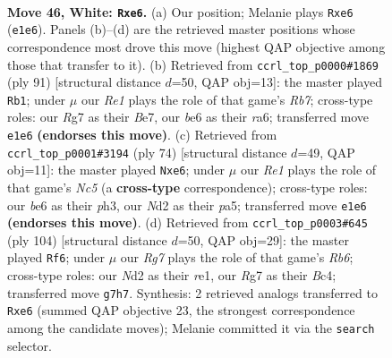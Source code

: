\documentclass[11pt]{article}
\begin{document}
\clearpage

\begin{figure}[p]\centering
\begin{subfigure}{0.46\textwidth}\centering
\resizebox{\linewidth}{!}{%
\newchessgame
\chessboard[
  setfen={5k2/6R1/2n1b2B/8/1p1p2P1/pP6/P1PN3K/4R3 w - - 1 46},
  showmover=false,
  pgfstyle=straightmove, color=movearrow, markmove={e1-e6}
]}
\caption{}
\end{subfigure}\hfill
\begin{subfigure}{0.46\textwidth}\centering
\resizebox{\linewidth}{!}{%
\newchessgame
\chessboard[
  setfen={8/4bk2/R4p2/2p3p1/4P2p/3K3P/1r1B1PP1/8 b - - 3 46},
  showmover=false,
  pgfstyle=straightmove, color=movearrow, markmove={b2-b1}
]}
\caption{}
\end{subfigure}
\\[4pt]
\begin{subfigure}{0.46\textwidth}\centering
\resizebox{\linewidth}{!}{%
\newchessgame
\chessboard[
  setfen={r7/4k3/1bp1b3/p1N1p2B/4P1P1/1P5p/P7/3R3K w - - 1 38},
  showmover=false,
  pgfstyle=straightmove, color=movearrow, markmove={c5-e6}
]}
\caption{}
\end{subfigure}\hfill
\begin{subfigure}{0.46\textwidth}\centering
\resizebox{\linewidth}{!}{%
\newchessgame
\chessboard[
  setfen={8/3b4/1R6/2kPp1p1/2B4p/3K1P1P/6P1/4r3 w - - 3 53},
  showmover=false,
  pgfstyle=straightmove, color=movearrow, markmove={b6-f6}
]}
\caption{}
\end{subfigure}
\caption{\textbf{Move 46, White: \texttt{Rxe6}.} (a) Our position; Melanie plays \texttt{Rxe6} (\texttt{e1e6}). Panels (b)--(d) are the retrieved master positions whose correspondence most drove this move (highest QAP objective among those that transfer to it). (b) Retrieved from \texttt{ccrl\_top\_p0000\#1869} (ply 91) [structural distance $d$=50, QAP obj=13]: the master played \texttt{Rb1}; under $\mu$ our \emph{Re1} plays the role of that game's \emph{Rb7}; cross-type roles: our \emph{R}g7 as their \emph{B}e7, our \emph{b}e6 as their \emph{r}a6; transferred move \texttt{e1e6} \textbf{(endorses this move)}. (c) Retrieved from \texttt{ccrl\_top\_p0001\#3194} (ply 74) [structural distance $d$=49, QAP obj=11]: the master played \texttt{Nxe6}; under $\mu$ our \emph{Re1} plays the role of that game's \emph{Nc5} (a \textbf{cross-type} correspondence); cross-type roles: our \emph{b}e6 as their \emph{p}h3, our \emph{N}d2 as their \emph{p}a5; transferred move \texttt{e1e6} \textbf{(endorses this move)}. (d) Retrieved from \texttt{ccrl\_top\_p0003\#645} (ply 104) [structural distance $d$=50, QAP obj=29]: the master played \texttt{Rf6}; under $\mu$ our \emph{Rg7} plays the role of that game's \emph{Rb6}; cross-type roles: our \emph{N}d2 as their \emph{r}e1, our \emph{R}g7 as their \emph{B}c4; transferred move \texttt{g7h7}. Synthesis: 2 retrieved analogs transferred to \texttt{Rxe6} (summed QAP objective 23, the strongest correspondence among the candidate moves); Melanie committed it via the \texttt{search} selector.}
\label{fig:thought-m90}
\end{figure}
\end{document}
